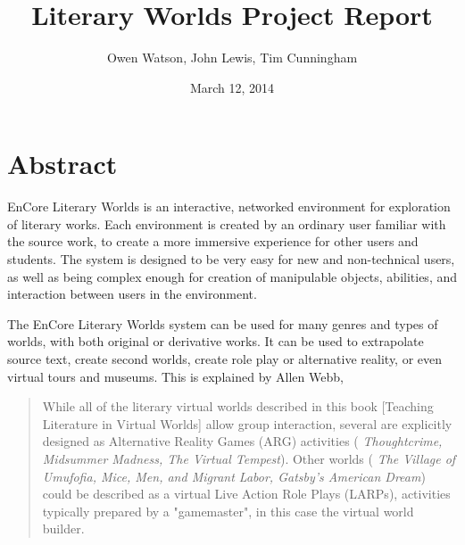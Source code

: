 \documentclass[12pt, letterpaper]{report}
\author{Owen Watson, John Lewis, Tim Cunningham}
\title{Literary Worlds Project Report}
\date{March 12, 2014}
\begin{document}
\begin{titlepage}
\Huge \maketitle \par
\end{titlepage}

%

\chapter{Abstract}
\par
EnCore Literary Worlds is an interactive, networked environment for exploration of literary works. Each environment is created by an ordinary user familiar with the source work, to create a more immersive experience for other users and students. The system is designed to be very easy for new and non-technical users, as well as being complex enough for creation of manipulable objects, abilities, and interaction between users in the environment.

\par
The EnCore Literary Worlds system can be used for many genres and types of worlds, with both original or derivative works. It can be used to extrapolate source text, create second worlds, create role play or alternative reality, or even virtual tours and museums. This is explained by Allen Webb,

\begin{quotation}
While all of the literary virtual worlds described in this book [Teaching Literature in Virtual Worlds] allow group interaction, several are explicitly designed as Alternative Reality Games (ARG) activities (%
\textit{Thoughtcrime, Midsummer Madness, The Virtual Tempest}). Other worlds (%
\textit{The Village of Umufofia, Mice, Men, and Migrant Labor, Gatsby's American Dream})
could be described as a virtual Live Action Role Plays (LARPs), activities typically prepared by a "gamemaster", in this case the virtual world builder.\cite[4]{Webb}
\end{quotation}
\end{document}
